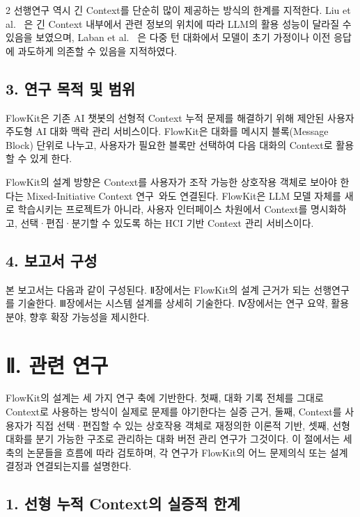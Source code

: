 \documentclass[10pt, a4paper]{article}
\begin{document}
\begin{multicols}{2}
선행연구 역시 긴 Context를 단순히 많이 제공하는 방식의 한계를 지적한다. Liu et al.~\cite{liu2024} 은 긴 Context 내부에서 관련 정보의 위치에 따라 LLM의 활용 성능이 달라질 수 있음을 보였으며, Laban et al.~\cite{laban2025} 은 다중 턴 대화에서 모델이 초기 가정이나 이전 응답에 과도하게 의존할 수 있음을 지적하였다.

\subsection*{3. 연구 목적 및 범위}

FlowKit은 기존 AI 챗봇의 선형적 Context 누적 문제를 해결하기 위해 제안된 사용자 주도형 AI 대화 맥락 관리 서비스이다. FlowKit은 대화를 메시지 블록(Message Block) 단위로 나누고, 사용자가 필요한 블록만 선택하여 다음 대화의 Context로 활용할 수 있게 한다.

FlowKit의 설계 방향은 Context를 사용자가 조작 가능한 상호작용 객체로 보아야 한다는 Mixed-Initiative Context 연구~\cite{li2026}와도 연결된다. FlowKit은 LLM 모델 자체를 새로 학습시키는 프로젝트가 아니라, 사용자 인터페이스 차원에서 Context를 명시화하고, 선택·편집·분기할 수 있도록 하는 HCI 기반 Context 관리 서비스이다.

\subsection*{4. 보고서 구성}

본 보고서는 다음과 같이 구성된다. Ⅱ장에서는 FlowKit의 설계 근거가 되는 선행연구를 기술한다. Ⅲ장에서는 시스템 설계를 상세히 기술한다. Ⅳ장에서는 연구 요약, 활용 분야, 향후 확장 가능성을 제시한다.

\section*{Ⅱ. 관련 연구}

FlowKit의 설계는 세 가지 연구 축에 기반한다. 첫째, 대화 기록 전체를 그대로 Context로 사용하는 방식이 실제로 문제를 야기한다는 실증 근거, 둘째, Context를 사용자가 직접 선택·편집할 수 있는 상호작용 객체로 재정의한 이론적 기반, 셋째, 선형 대화를 분기 가능한 구조로 관리하는 대화 버전 관리 연구가 그것이다. 이 절에서는 세 축의 논문들을 흐름에 따라 검토하며, 각 연구가 FlowKit의 어느 문제의식 또는 설계 결정과 연결되는지를 설명한다.

\subsection*{1. 선형 누적 Context의 실증적 한계}


\end{multicols}
\end{document}
